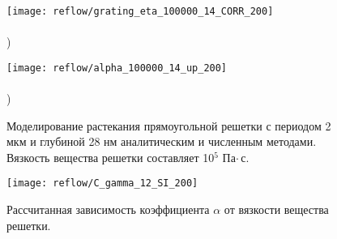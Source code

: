 \begin{figure}[t]
	\begin{minipage}{0.5\textwidth}
		\texttt{[image: reflow/grating\_eta\_100000\_14\_CORR\_200]} \\
		\vspace{-28.5ex} \\ ) \\ \vspace{28.5ex}
	\end{minipage}
	\begin{minipage}{0.5\textwidth}
		\hspace{-1em} \texttt{[image: reflow/alpha\_100000\_14\_up\_200]} \\
		\vspace{-28.5ex} \\ ) \\ \vspace{28.5ex}
	\end{minipage}
	\vspace{-3.5em}
	\caption{Моделирование растекания прямоугольной решетки с периодом 2 мкм и глубиной 28 нм аналитическим и численным методами. Вязкость вещества решетки составляет 10$^\text{5}$ Па\:$\cdot$\,с.}
	\label{fig:reflow_1}
\end{figure}

\begin{figure}[h]
	\begin{center}
		\texttt{[image: reflow/С\_gamma\_12\_SI\_200]}
	\end{center}
	\vspace{-1.2em}
	\caption{Рассчитанная зависимость коэффициента $\alpha$ от вязкости вещества решетки.}
	\label{fig:eta_alpha}
\end{figure}

